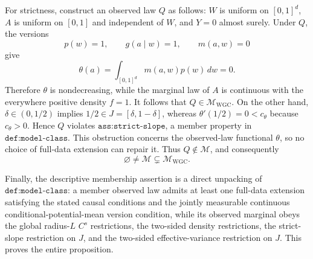 For strictness, construct an observed law \(Q\) as follows: \(W\) is uniform on \([0,1]^d\), \(A\) is uniform on \([0,1]\) and independent of \(W\), and \(Y=0\) almost surely. Under \(Q\), the versions
\[
p(w)=1,
\qquad
g(a\mid w)=1,
\qquad
m(a,w)=0
\]
give
\[
\theta(a)=\int_{[0,1]^d}m(a,w)p(w)\,dw=0.
\]
Therefore \(\theta\) is nondecreasing, while the marginal law of \(A\) is continuous with the everywhere positive density \(f=1\). It follows that \(Q\in\mathcal M_{\mathrm{WGC}}\). On the other hand, \(\delta\in(0,1/2)\) implies \(1/2\in J=[\delta,1-\delta]\), whereas \(\theta'(1/2)=0<c_{\theta}\) because \(c_{\theta}>0\). Hence \(Q\) violates \(\texttt{ass:strict-slope}\), a member property in \(\texttt{def:model-class}\). This obstruction concerns the observed-law functional \(\theta\), so no choice of full-data extension can repair it. Thus \(Q\notin\mathcal M\), and consequently
\[
\varnothing\ne\mathcal M\subsetneq\mathcal M_{\mathrm{WGC}}.
\]

Finally, the descriptive membership assertion is a direct unpacking of \(\texttt{def:model-class}\): a member observed law admits at least one full-data extension satisfying the stated causal conditions and the jointly measurable continuous conditional-potential-mean version condition, while its observed marginal obeys the global radius-\(L\) \(C^s\) restrictions, the two-sided density restrictions, the strict-slope restriction on \(J\), and the two-sided effective-variance restriction on \(J\). This proves the entire proposition.
